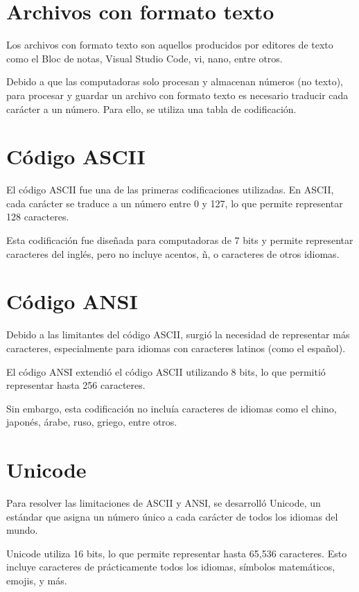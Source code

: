 \section{Archivos con formato texto}

Los archivos con formato texto son aquellos producidos por editores de texto como el Bloc de notas, Visual Studio Code, vi, nano, entre otros.

Debido a que las computadoras solo procesan y almacenan números (no texto), para procesar y guardar un archivo con formato texto es necesario traducir cada carácter a un número. Para ello, se utiliza una tabla de codificación.

\section{Código ASCII}

El código ASCII fue una de las primeras codificaciones utilizadas. En ASCII, cada carácter se traduce a un número entre 0 y 127, lo que permite representar 128 caracteres.

Esta codificación fue diseñada para computadoras de 7 bits y permite representar caracteres del inglés, pero no incluye acentos, ñ, o caracteres de otros idiomas.

\section{Código ANSI}

Debido a las limitantes del código ASCII, surgió la necesidad de representar más caracteres, especialmente para idiomas con caracteres latinos (como el español).

El código ANSI extendió el código ASCII utilizando 8 bits, lo que permitió representar hasta 256 caracteres.

Sin embargo, esta codificación no incluía caracteres de idiomas como el chino, japonés, árabe, ruso, griego, entre otros.

\section{Unicode}

Para resolver las limitaciones de ASCII y ANSI, se desarrolló Unicode, un estándar que asigna un número único a cada carácter de todos los idiomas del mundo.

Unicode utiliza 16 bits, lo que permite representar hasta 65,536 caracteres. Esto incluye caracteres de prácticamente todos los idiomas, símbolos matemáticos, emojis, y más.

